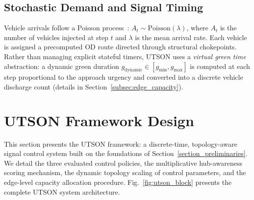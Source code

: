 \documentclass[letterpaper, conference]{IEEEtran}
\begin{document}
\subsection{Stochastic Demand and Signal Timing}
Vehicle arrivals follow a Poisson process~\cite{ross2014poisson,daganzo1994queue}: $A_t\sim\mathrm{Poisson}(\lambda)$, where $A_t$ is the number of vehicles injected at step $t$ and $\lambda$ is the mean arrival rate. Each vehicle is assigned a precomputed OD route directed through structural chokepoints. Rather than managing explicit stateful timers, UTSON uses a \emph{virtual green time} abstraction: a dynamic green duration $g_{\mathrm{dynamic}}\in[g_{\min},g_{\max}]$ is computed at each step proportional to the approach urgency and converted into a discrete vehicle discharge count (details in Section~\ref{subsec:edge_capacity}).

\section{UTSON Framework Design}
\label{section_methodology}

This section presents the UTSON framework: a discrete-time, topology-aware signal control system built on the foundations of Section~\ref{section_preliminaries}. We detail the three evaluated control policies, the multiplicative hub-awareness scoring mechanism, the dynamic topology scaling of control parameters, and the edge-level capacity allocation procedure. Fig.~\ref{fig:utson_block} presents the complete UTSON system architecture.
\end{document}
